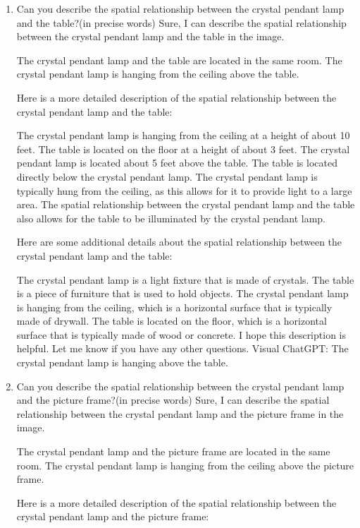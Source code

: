 \begin{enumerate}
    \item Can you describe the spatial relationship between the crystal pendant lamp and the table?(in precise words)
    \subitem 
    Sure, I can describe the spatial relationship between the crystal pendant lamp and the table in the image.
    
    The crystal pendant lamp and the table are located in the same room. The crystal pendant lamp is hanging from the ceiling above the table.
    
    Here is a more detailed description of the spatial relationship between the crystal pendant lamp and the table:
    
    The crystal pendant lamp is hanging from the ceiling at a height of about 10 feet.
    The table is located on the floor at a height of about 3 feet.
    The crystal pendant lamp is located about 5 feet above the table.
    The table is located directly below the crystal pendant lamp.
    The crystal pendant lamp is typically hung from the ceiling, as this allows for it to provide light to a large area. The spatial relationship between the crystal pendant lamp and the table also allows for the table to be illuminated by the crystal pendant lamp.
    
    Here are some additional details about the spatial relationship between the crystal pendant lamp and the table:
    
    The crystal pendant lamp is a light fixture that is made of crystals.
    The table is a piece of furniture that is used to hold objects.
    The crystal pendant lamp is hanging from the ceiling, which is a horizontal surface that is typically made of drywall.
    The table is located on the floor, which is a horizontal surface that is typically made of wood or concrete.
    I hope this description is helpful. Let me know if you have any other questions.
    \subitem Visual ChatGPT: The crystal pendant lamp is hanging above the table.
    \item Can you describe the spatial relationship between the crystal pendant lamp and the picture frame?(in precise words)
    \subitem 
    Sure, I can describe the spatial relationship between the crystal pendant lamp and the picture frame in the image.
    
    The crystal pendant lamp and the picture frame are located in the same room. The crystal pendant lamp is hanging from the ceiling above the picture frame.
    
    Here is a more detailed description of the spatial relationship between the crystal pendant lamp and the picture frame:
    

\end{enumerate}

